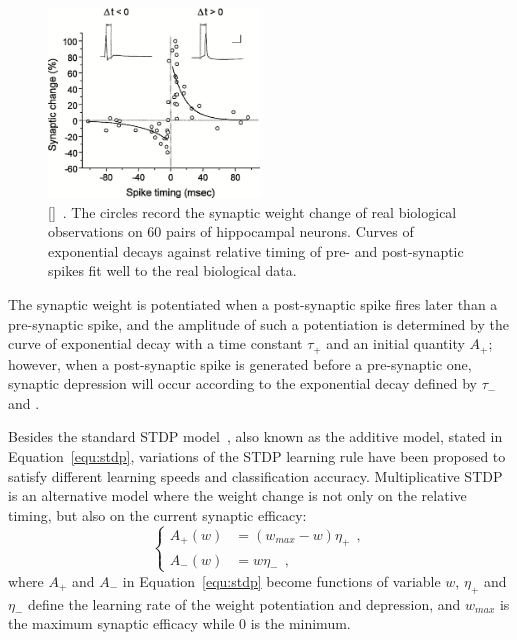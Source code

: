 \begin{figure}[bt!]
	\centering
	\includegraphics[width=0.5\textwidth]{pics_snn/stdp.jpeg}
	\caption{\DIFdelbeginFL {}\DIFdelendFL \DIFaddbeginFL {}[]\DIFaddendFL ~\citep{bi2001synaptic}.
	The circles record the synaptic weight change of real biological observations on 60 pairs of hippocampal neurons.
	Curves of exponential decays against relative timing of pre- and post-synaptic spikes fit well to the real biological data.
	}
	\label{Fig:STDP}
\end{figure}

The synaptic weight is potentiated when a post-synaptic spike fires later than a pre-synaptic spike, and the amplitude of such a potentiation is determined by the curve of exponential decay with a time constant $\tau_+$ and an initial quantity $A_+$;
however, when a post-synaptic spike is generated before a pre-synaptic one, synaptic depression will occur according to the exponential decay defined by $\tau_-$ and \DIFdelbegin {}\DIFdelend \DIFaddbegin {}\DIFaddend .

Besides the standard STDP model~\citep{song2000competitive}, also known as the additive model, stated in Equation~\ref{equ:stdp}, variations of the STDP learning rule have been proposed to satisfy different learning speeds and classification accuracy.
Multiplicative STDP~\citep{morrison2008phenomenological} is an alternative model where the weight change is not only \DIFdelbegin {}\DIFdelend \DIFaddbegin {}\DIFaddend on the relative timing, but also on the current synaptic efficacy:
\begin{equation}
\left\{
\begin{aligned}
A_+ (w) &=  (w_{max} - w)\eta_+~~, \\
A_- (w) &= w\eta_-~~,
\end{aligned}
\right.
\end{equation}
where $A_+$ and $A_-$ in Equation~\ref{equ:stdp} become functions of variable 
$w$, $\eta_+$ and $\eta_-$ define the learning rate of the weight potentiation and depression, and $w_{max}$ is the maximum synaptic efficacy while 0 is the minimum.

